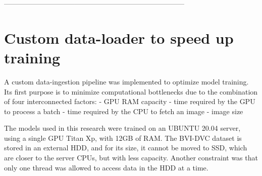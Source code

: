 % 
% 
% 
% 

-----------------------------------------------------------------------------

\section{Custom data-loader to speed up training}
\label{sec:custom-dataloader}

A custom data-ingestion pipeline was implemented to optimize model training.
Its first purpose is to minimize computational bottlenecks due to the combination of four interconnected factors:
- GPU RAM capacity
- time required by the GPU to process a batch
- time required by the CPU to fetch an image
- image size

The models used in this research were trained on an UBUNTU 20.04 server, using a single GPU Titan Xp, with 12GB of RAM. The BVI-DVC dataset is stored in an external HDD, and for its size, it cannot be moved to SSD, which are closer to the server CPUs, but with less capacity. Another constraint was that only one thread was allowed to access data in the HDD at a time.

